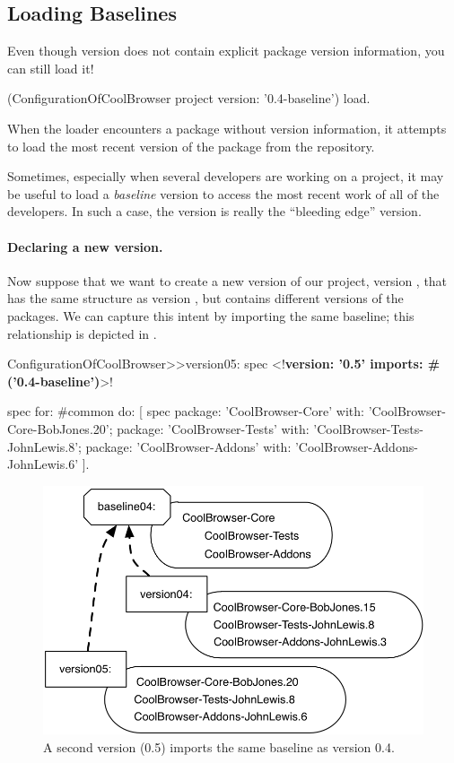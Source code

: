 \documentclass[a4paper,10pt,twoside]{book}
\begin{document}
\subsection{Loading Baselines}
Even though version  does not contain explicit package version information, you can still load it!
\begin{code}{}
(ConfigurationOfCoolBrowser project version: '0.4-baseline') load.
\end{code}
\noindent
When the loader encounters a package without version information, it attempts to load the most recent version of the package from the repository.

Sometimes, especially when several developers are working on a project, it may be useful to load a \emph{baseline} version to access the most recent work of all of the developers.  In such a case, the  version is really the ``bleeding edge'' version.

\paragraph{Declaring a new version.}
Now suppose that we want to create a new version of our project, version , that has the same structure as version , but contains different  versions of the packages.  We can capture this intent by importing the same baseline; this relationship is depicted in .


\begin{code}{}
ConfigurationOfCoolBrowser>>version05: spec
       <!\textbf{version: '0.5' imports: \#('0.4-baseline')}>!

      spec for: #common do: [
            spec
                  package: 'CoolBrowser-Core' with: 'CoolBrowser-Core-BobJones.20';
                  package: 'CoolBrowser-Tests' with: 'CoolBrowser-Tests-JohnLewis.8';
                  package: 'CoolBrowser-Addons' with: 'CoolBrowser-Addons-JohnLewis.6' ].
\end{code}

\begin{figure}
\begin{center}
\includegraphics[width=0.6\linewidth]{version05}
\caption{A second version (0.5) imports the same baseline as version 0.4.}\label{fig:version05}
\end{center}
\end{figure}
\end{document}
